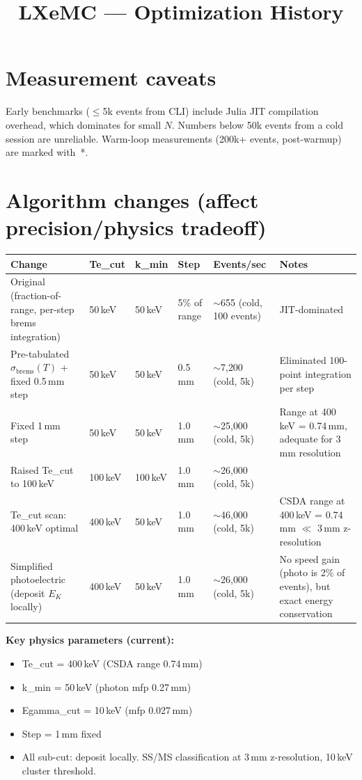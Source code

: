 \documentclass{article}
\title{LXeMC --- Optimization History}
\author{}
\date{}
\begin{document}
\maketitle

\section{Measurement caveats}

Early benchmarks ($\leq$5k events from CLI) include Julia JIT compilation
overhead, which dominates for small $N$. Numbers below 50k events from
a cold session are unreliable. Warm-loop measurements (200k+ events,
post-warmup) are marked with~*.

\section{Algorithm changes (affect precision/physics tradeoff)}

\begin{table}[htbp]
\centering
\small
\begin{tabular}{@{}lllllp{4.5cm}@{}}
\toprule
Change & Te\_cut & k\_min & Step & Events/sec & Notes \\
\midrule
Original (fraction-of-range, per-step brems integration)
  & 50\,keV & 50\,keV & 5\% of range & $\sim$655 (cold, 100 events)
  & JIT-dominated \\
Pre-tabulated $\sigma_\mathrm{brems}(T)$ + fixed 0.5\,mm step
  & 50\,keV & 50\,keV & 0.5\,mm & $\sim$7{,}200 (cold, 5k)
  & Eliminated 100-point integration per step \\
Fixed 1\,mm step
  & 50\,keV & 50\,keV & 1.0\,mm & $\sim$25{,}000 (cold, 5k)
  & Range at 400\,keV = 0.74\,mm, adequate for 3\,mm resolution \\
Raised Te\_cut to 100\,keV
  & 100\,keV & 100\,keV & 1.0\,mm & $\sim$26{,}000 (cold, 5k)
  & \\
Te\_cut scan: 400\,keV optimal
  & 400\,keV & 50\,keV & 1.0\,mm & $\sim$46{,}000 (cold, 5k)
  & CSDA range at 400\,keV = 0.74\,mm $\ll$ 3\,mm z-resolution \\
Simplified photoelectric (deposit $E_K$ locally)
  & 400\,keV & 50\,keV & 1.0\,mm & $\sim$26{,}000 (cold, 5k)
  & No speed gain (photo is 2\% of events), but exact energy conservation \\
\bottomrule
\end{tabular}
\end{table}

\textbf{Key physics parameters (current):}
\begin{itemize}
  \item Te\_cut = 400\,keV (CSDA range 0.74\,mm)
  \item k\_min = 50\,keV (photon mfp 0.27\,mm)
  \item Egamma\_cut = 10\,keV (mfp 0.027\,mm)
  \item Step = 1\,mm fixed
  \item All sub-cut: deposit locally. SS/MS classification at 3\,mm
        z-resolution, 10\,keV cluster threshold.
\end{itemize}
\end{document}

